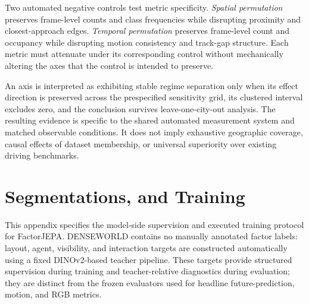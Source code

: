 Two automated negative controls test metric specificity.
\emph{Spatial permutation} preserves frame-level counts and class
frequencies while disrupting proximity and closest-approach edges.
\emph{Temporal permutation} preserves frame-level count and occupancy
while disrupting motion consistency and track-gap structure. Each
metric must attenuate under its corresponding control without
mechanically altering the axes that the control is intended to preserve.

An axis is interpreted as exhibiting stable regime separation only
when its effect direction is preserved across the prespecified
sensitivity grid, its clustered interval excludes zero, and the
conclusion survives leave-one-city-out analysis. The resulting evidence
is specific to the shared automated measurement system and matched
observable conditions. It does not imply exhaustive geographic
coverage, causal effects of dataset membership, or universal
superiority over existing driving benchmarks.















































\section{Segmentations, and Training}
\label{app:factor_reproducibility}

This appendix specifies the model-side supervision and executed training
protocol for FactorJEPA. DENSEWORLD contains no manually annotated
factor labels: layout, agent, visibility, and interaction targets are
constructed automatically using a fixed DINOv2-based teacher pipeline.
These targets provide structured supervision during training and
teacher-relative diagnostics during evaluation; they are distinct from
the frozen evaluators used for headline future-prediction, motion, and
RGB metrics.


